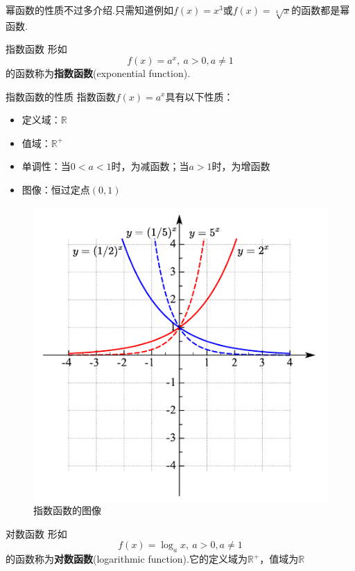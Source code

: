 \documentclass[lang=cn, zihao=5]{elegantbook}
\begin{document}
幂函数的性质不过多介绍.只需知道例如$f(x)=x^3$或$f(x)=\sqrt[4]{x}$的函数都是幂函数.

\begin{definition}{指数函数}
    形如$$f(x)=a^x, \ a>0 , a\neq 1$$
    的函数称为\textbf{指数函数}(exponential function).
\end{definition}

\begin{proposition}{指数函数的性质}
    指数函数$f(x)=a^x$具有以下性质：
    \begin{itemize}
        \item 定义域：$\mathbb{R}$
        \item 值域：$\mathbb{R}^+$
        \item 单调性：当$0<a<1$时，为减函数；当$a>1$时，为增函数
        \item 图像：恒过定点$(0,1)$
    \end{itemize}
\end{proposition}

\begin{figure}[h!]
	\centering
	\includegraphics{attachment/20230402viuuhjuu.pdf}
	\caption{指数函数的图像}
\end{figure}

\begin{definition}{对数函数}
    形如$$f(x)=\log_{a}{x}, \ a>0,a \neq 1$$
    的函数称为\textbf{对数函数}(logarithmic function).它的定义域为$\mathbb{R}^{+}$，值域为$\mathbb{R}$
\end{definition}
\end{document}
